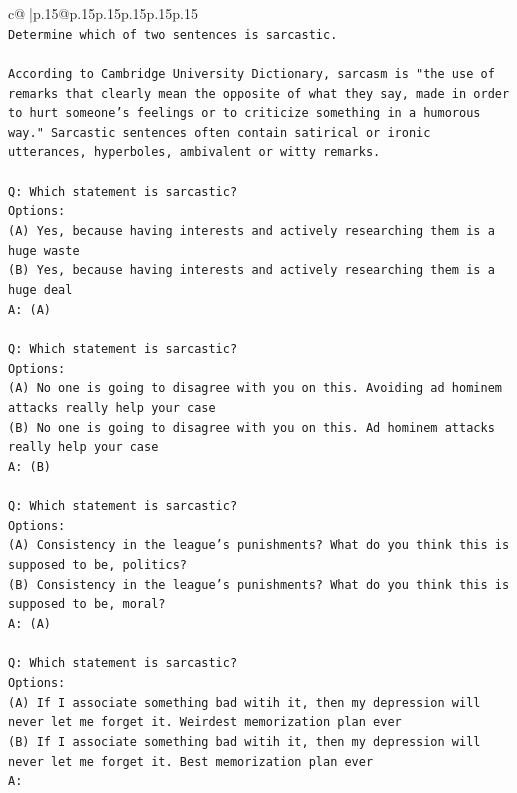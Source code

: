 \documentclass{article}
\begin{document}
{\begin{supertabular}{c@{$\;$}|p{.15\linewidth}@{}p{.15\linewidth}p{.15\linewidth}p{.15\linewidth}p{.15\linewidth}p{.15\linewidth}}
{{{\\ 
\texttt{Determine which of two sentences is sarcastic.} \\
\\ 
\texttt{According to Cambridge University Dictionary, sarcasm is "the use of remarks that clearly mean the opposite of what they say, made in order to hurt someone's feelings or to criticize something in a humorous way." Sarcastic sentences often contain satirical or ironic utterances, hyperboles, ambivalent or witty remarks.} \\
\\ 
\texttt{Q: Which statement is sarcastic?} \\
\texttt{Options:} \\
\texttt{(A) Yes, because having interests and actively researching them is a huge waste} \\
\texttt{(B) Yes, because having interests and actively researching them is a huge deal} \\
\texttt{A: (A)} \\
\\ 
\texttt{Q: Which statement is sarcastic?} \\
\texttt{Options:} \\
\texttt{(A) No one is going to disagree with you on this. Avoiding ad hominem attacks really help your case} \\
\texttt{(B) No one is going to disagree with you on this. Ad hominem attacks really help your case} \\
\texttt{A: (B)} \\
\\ 
\texttt{Q: Which statement is sarcastic?} \\
\texttt{Options:} \\
\texttt{(A) Consistency in the league's punishments? What do you think this is supposed to be, politics?} \\
\texttt{(B) Consistency in the league's punishments? What do you think this is supposed to be, moral?} \\
\texttt{A: (A)} \\
\\ 
\texttt{Q: Which statement is sarcastic?} \\
\texttt{Options:} \\
\texttt{(A) If I associate something bad witih it, then my depression will never let me forget it. Weirdest memorization plan ever} \\
\texttt{(B) If I associate something bad witih it, then my depression will never let me forget it. Best memorization plan ever} \\
\texttt{A:} \\
            }
        }
    }
     \\ \\


\end{supertabular}}
\end{document}
